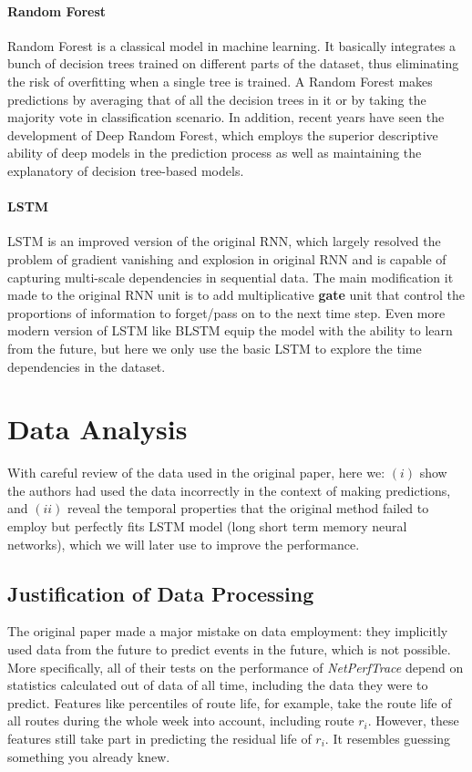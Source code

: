 \documentclass[sigconf]{acmart}
\newcommand{\heng}[1]{{\bf \color{cyan} [[Yuheng says ``#1'']]}}
\newcommand{\hui}[1]{{\bf \color{purple} [[Zhenghui says ``#1'']]}}
\begin{document}
	\paragraph{Random Forest} Random Forest is a classical model in machine learning. It basically integrates a bunch of decision trees trained on different parts of the dataset, thus eliminating the risk of overfitting when a single tree is trained. A Random Forest makes predictions by averaging that of all the decision trees in it or by taking the majority vote in classification scenario. In addition, recent years have seen the development of Deep Random Forest, which employs the superior descriptive ability of deep models in the prediction process as well as maintaining the explanatory of decision tree-based models.
	
	\paragraph{LSTM} LSTM is an improved version of the original RNN, which largely resolved the problem of gradient vanishing and explosion in original RNN and is capable of capturing multi-scale dependencies in sequential data. The main modification it made to the original RNN unit is to add multiplicative \textbf{gate} unit that control the proportions of information to forget/pass on to the next time step. Even more modern version of LSTM like BLSTM equip the model with the ability to learn from the future, but here we only use the basic LSTM to explore the time dependencies in the dataset.
	
	\section{Data Analysis}
	\label{sec:dataAna}
	With careful review of the data used in the original paper, here we: $(i)$ show the authors had used the data incorrectly in the context of making predictions, and $(ii)$ reveal the temporal properties that the original method failed to employ but perfectly fits LSTM model (long short term memory neural networks), which we will later use to improve the performance.
	\subsection{Justification of Data Processing}
	The original paper \cite{oripaper} made a major mistake on data employment: they implicitly used data from the future to predict events in the future, which is not possible. More specifically, all of their tests on the performance of \textit{NetPerfTrace} depend on statistics calculated out of data of all time, including the data they were to predict. Features like percentiles of route life, for example, take the route life of all routes during the whole week into account, including route $r_i$. However, these features still take part in predicting the residual life of $r_i$. It resembles guessing something you already knew.
	
\end{document}
